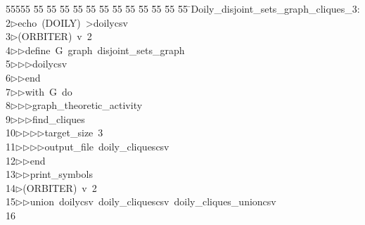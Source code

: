 %
%
\begin{tabbing}
55555 \= 55 \= 55 \= 55 \= 55 \= 55 \= 55 \= 55 \= 55 \= 55 \= 55 \= 55 \= 55 \= \>Doily\_disjoint\_sets\_graph\_cliques\_3:\\[0pt]
2\>$\triangleright$\>echo\ (DOILY)\ {\textgreater}doilycsv\\[0pt]
3\>$\triangleright$\>(ORBITER)\ v\ 2\ \\[0pt]
4\>$\triangleright$\>$\triangleright$\>define\ G\ graph\ disjoint\_sets\_graph\ \\[0pt]
5\>$\triangleright$\>$\triangleright$\>$\triangleright$\>doilycsv\ \\[0pt]
6\>$\triangleright$\>$\triangleright$\>end\ \\[0pt]
7\>$\triangleright$\>$\triangleright$\>with\ G\ do\ \\[0pt]
8\>$\triangleright$\>$\triangleright$\>$\triangleright$\>graph\_theoretic\_activity\ \\[0pt]
9\>$\triangleright$\>$\triangleright$\>$\triangleright$\>find\_cliques\ \\[0pt]
10\>$\triangleright$\>$\triangleright$\>$\triangleright$\>$\triangleright$\>target\_size\ 3\ \\[0pt]
11\>$\triangleright$\>$\triangleright$\>$\triangleright$\>$\triangleright$\>output\_file\ doily\_cliquescsv\ \\[0pt]
12\>$\triangleright$\>$\triangleright$\>end\ \\[0pt]
13\>$\triangleright$\>$\triangleright$\>print\_symbols\\[0pt]
14\>$\triangleright$\>(ORBITER)\ v\ 2\ \\[0pt]
15\>$\triangleright$\>$\triangleright$\>union\ doilycsv\ doily\_cliquescsv\ doily\_cliques\_unioncsv\\[0pt]
16\>\end{tabbing}
